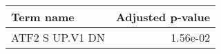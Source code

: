 \begin{tabular}{lr}
\toprule
      Term name &  Adjusted p-value \\
\midrule
ATF2 S UP.V1 DN &          1.56e-02 \\
\bottomrule
\end{tabular}
